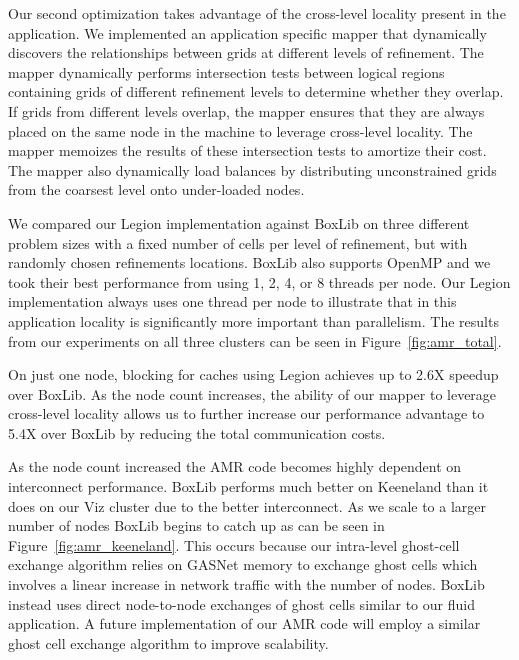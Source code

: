 Our second optimization takes advantage of the cross-level locality present in the application.  We implemented
an application specific mapper that dynamically discovers the relationships between
grids at different levels of refinement.  The mapper dynamically performs intersection tests between logical regions
containing grids of different refinement levels to determine whether they overlap.  
If grids from different levels overlap, the mapper
ensures that they are always placed on the same node in the machine to leverage cross-level locality.  The mapper
memoizes the results of these intersection tests to amortize their cost.  The mapper also dynamically
load balances by distributing unconstrained grids from the coarsest level onto under-loaded nodes.

We compared our Legion implementation against BoxLib on three different problem sizes with a fixed number
of cells per level of refinement, but with randomly chosen refinements locations.  BoxLib also supports OpenMP
and we took their best performance from using 1, 2, 4, or 8 threads per node.  Our Legion implementation
always uses one thread per node to illustrate that in this application locality is significantly more important 
than parallelism.  The results from our experiments on all three clusters can be seen in Figure~\ref{fig:amr_total}. 

On just one node, blocking for caches using Legion achieves up to 2.6X speedup over BoxLib.  As the node count 
increases, the ability of our mapper to leverage cross-level locality allows us to further increase
our performance advantage to 5.4X over BoxLib by reducing the total communication costs.  

As the node count increased the AMR code becomes highly dependent on interconnect performance.  BoxLib performs much better
on Keeneland than it does on our Viz cluster due to the better interconnect.  As we scale
to a larger number of nodes BoxLib begins to catch up as can be seen in Figure~\ref{fig:amr_keeneland}.  
This occurs because our intra-level ghost-cell exchange algorithm relies on GASNet memory to exchange ghost cells which 
involves a linear increase in network traffic with the number of nodes.  BoxLib instead uses direct
node-to-node exchanges of ghost cells similar to our fluid application.  A future implementation of our AMR code 
will employ a similar ghost cell exchange algorithm to improve scalability.


